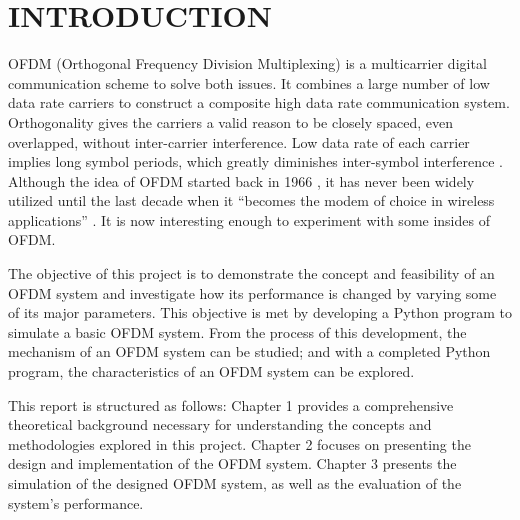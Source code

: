 \section*{INTRODUCTION}


OFDM (Orthogonal Frequency Division Multiplexing) is a multicarrier digital communication scheme to solve both issues. It combines a large number of low data rate carriers to construct a composite high data rate communication system. Orthogonality gives the carriers a valid reason to be closely spaced, even overlapped, without inter-carrier interference. Low data rate of each carrier implies long symbol periods, which greatly diminishes inter-symbol interference \cite{b3}. Although the idea of OFDM started back in 1966 \cite{b4}, it has never been widely utilized until the last decade when it “becomes the modem of choice in wireless applications” \cite{b5}. It is now interesting enough to experiment with some insides of OFDM.

The objective of this project is to demonstrate the concept and feasibility of an OFDM system and investigate how its performance is changed by varying some of its major parameters. This objective is met by developing a Python program to simulate a basic OFDM system. From the process of this development, the mechanism of an OFDM system can be studied; and with a completed Python program, the characteristics of an OFDM system can be explored.

This report is structured as follows: Chapter 1 provides a comprehensive theoretical background necessary for understanding the concepts and methodologies explored in this project. Chapter 2 focuses on presenting the design and implementation of the OFDM system. Chapter 3 presents the simulation of the designed OFDM system, as well as the evaluation of the system's performance.